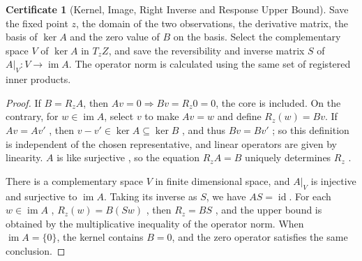 \documentclass[12pt,a4paper,openany,notitlepage]{report}
\theoremstyle{plain}
\theoremstyle{definition}
\newtheorem*{certificate}{Certificate}
\theoremstyle{remark}
\def\mathcal#1{#1}\def\mathsf#1{#1}\def\mathbb#1{#1}%
\begin{document}
\begin{CJK*}
\begin{certificate}
[Kernel, Image, Right Inverse and Response Upper Bound]Save the fixed point $z$, the domain of the two observations, the derivative matrix, the basis of $\ker A$ and the zero value of $B$ on the basis. Select the complementary space $V$ of $\ker A$ in $T_z\mathcal Z$, and save the reversibility and inverse matrix $S$ of $A|_V:V\to\operatorname{im}A$. The operator norm is calculated using the same set of registered inner products.\end{certificate}


\begin{proof}
If $B=\mathcal R_zA$, then $Av=0\Rightarrow Bv=\mathcal R_z0=0$, the core is included. On the contrary, for $w\in\operatorname{im}A$, select $v$ to make $Av=w$ and define $\mathcal R_z(w)=Bv$. If $Av=Av'$ , then $v-v'\in\ker A\subseteq\ker B$ , and thus $Bv=Bv'$ ; so this definition is independent of the chosen representative, and linear operators are given by linearity. $A$ is like surjective , so the equation $\mathcal R_zA=B$ uniquely determines $\mathcal R_z$ .

There is a complementary space $V$ in finite dimensional space, and $A|_V$ is injective and surjective to $\operatorname{im}A$. Taking its inverse as $S$, we have $AS=\operatorname{id}$. For each $w\in\operatorname{im}A$ , $\mathcal R_z(w)=B(Sw)$ , then $\mathcal R_z=BS$ , and the upper bound is obtained by the multiplicative inequality of the operator norm. When $\operatorname{im}A=\{0\}$, the kernel contains $B=0$, and the zero operator satisfies the same conclusion.\end{proof}



\end{CJK*}
\end{document}
